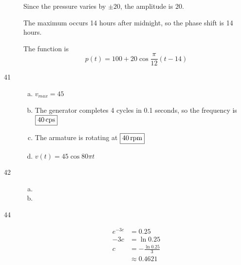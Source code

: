 \documentclass{exam}
\begin{document}
\begin{description}
        Since the pressure varies by $\pm 20$, the amplitude is $20$.

        The maximum occurs 14 hours after midnight, so the phase shift is 14 hours.

        The function is
        \[
          \boxed{ p(t) = 100 + 20 \cos \frac{\pi}{12} (t - 14) }
        \]

      \item[41]
        \begin{enumerate}[(a)]
          \item $\boxed{ v_{max} = 45 }$

          \item The generator completes 4 cycles in 0.1 seconds, so the frequency is $\boxed{ \unit[ 40 ]{cps} }$

          \item The armature is rotating at $\boxed{ \unit[ 40 ]{rpm} }$

          \item $\boxed{ v(t) = 45 \cos 80 \pi t }$

        \end{enumerate}

      \item[42]
        \begin{enumerate}[(a)]
          \item 

          \item 
        \end{enumerate}

      \item[44]
        \begin{align*}
          e^{-3c} & = 0.25 \\
          -3c     & = \ln 0.25 \\
          c       & = - \frac{\ln 0.25}{3} \\
                  & \approx \boxed{ 0.4621 } \\
        \end{align*}


\end{description}
\end{document}
